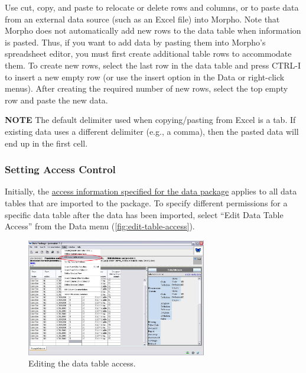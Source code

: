 Use cut, copy, and paste to relocate or delete rows and columns, or to
paste data from an external data source (such as an Excel file) into
Morpho. Note that Morpho does not automatically add new rows to the data
table when information is pasted. Thus, if you want to add data by
pasting them into Morpho's spreadsheet editor, you must first create
additional table rows to accommodate them. To create new rows, select
the last row in the data table and press CTRL-I to insert a new empty
row (or use the insert option in the Data or right-click menus). After
creating the required number of new rows, select the top empty row and
paste the new data. 

\begin{shaded}
  \textbf{NOTE} The default delimiter used when copying/pasting from
  Excel is a tab. If existing data uses a different delimiter (e.g., a
  comma), then the pasted data will end up in the first cell.
\end{shaded}

\subsubsection{Setting Access Control} \label{sec:edit-table-access}

Initially, the \hyperref[sec:wizard-dp-access]{access information
specified for the data package} applies to all data tables that
are imported to the package. To specify different permissions for a 
specific data table after the data has been imported,
select ``Edit Data Table Access'' from the Data menu
(\autoref{fig:edit-table-access}).

\begin{figure}
  \centering
    \includegraphics[width=0.7\textwidth]{images/edit-table-access.jpg}
  \caption{Editing the data table access.}
  \label{fig:edit-table-access}
\end{figure}

